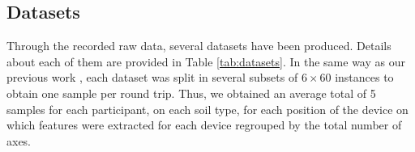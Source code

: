 \documentclass[10pt,conference]{IEEEtran}
\begin{document}





\subsection{Datasets}

Through the recorded raw data, several datasets have been produced. Details about each of them are provided in Table \ref{tab:datasets}. In the same way as our previous work {\cite{Thullier2017b}}, each dataset was split  in several subsets of $6 \times 60$ instances to obtain one sample per round trip. Thus, we obtained an average total of 5 samples for each participant, on each soil type, for each position of the device on which features were extracted for each device regrouped by the total number of axes.


\end{document}

